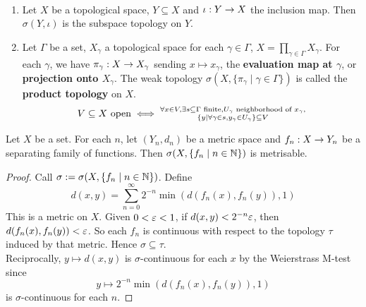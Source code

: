 \documentclass{article}
\begin{document}
\begin{egs}~
  \begin{enumerate}
    \item Let $X$ be a topological space, $Y \subseteq X$ and $\iota : Y \rightarrow X$ the inclusion map. Then $\sigma(Y, {\iota})$ is the subspace topology on $Y$.
    \item Let $\Gamma$ be a set, $X_\gamma$ a topological space for each $\gamma \in \Gamma$, $X = \prod_{\gamma \in \Gamma} X_\gamma$. For each $\gamma$, we have $\pi_\gamma : X \rightarrow X_\gamma$ sending $x \mapsto x_\gamma$, the {\bf evaluation map at $\gamma$}, or {\bf projection onto $X_\gamma$}. The weak topology $\sigma(X, \{\pi_\gamma \mid \gamma \in \Gamma\})$ is called the {\bf product topology} on $X$.
    $$V \subseteq X \text{ open} \iff \substack{\forall x \in V, \exists s \subseteq \Gamma \text{ finite}, U_\gamma \text{ neighborhood of } x_\gamma, \\ \{y \mid \forall \gamma \in s, y_\gamma \in U_\gamma\} \subseteq V}$$
  \end{enumerate}
\end{egs}

\begin{nprop}\label{prop:lcs-metrisable}
  Let $X$ be a set. For each $n$, let $(Y_n, d_n)$ be a metric space and $f_n : X \rightarrow Y_n$ be a separating family of functions. Then $\sigma(X, \{f_n \mid n \in \mathbb N\})$ is metrisable.
\end{nprop}
\begin{proof}
  Call $\sigma := \sigma(X, \{f_n \mid n \in \mathbb N\})$. Define
  $$d(x, y) = \sum_{n = 0}^\infty 2^{-n}\min(d(f_n(x), f_n(y)), 1)$$
  This is a metric on $X$. Given $0 < \varepsilon < 1$, if $d(x, y) < 2^{-n}\varepsilon$, then $d(f_n(x), f_n(y)) < \varepsilon$. So each $f_n$ is continuous with respect to the topology $\tau$ induced by that metric. Hence $\sigma \subseteq \tau$. \\
  Reciprocally, $y \mapsto d(x, y)$ is $\sigma$-continuous for each $x$ by the Weierstrass M-test since
  $$y \mapsto 2^{-n}\min(d(f_n(x), f_n(y)), 1)$$
  is $\sigma$-continuous for each $n$.
\end{proof}
\end{document}
